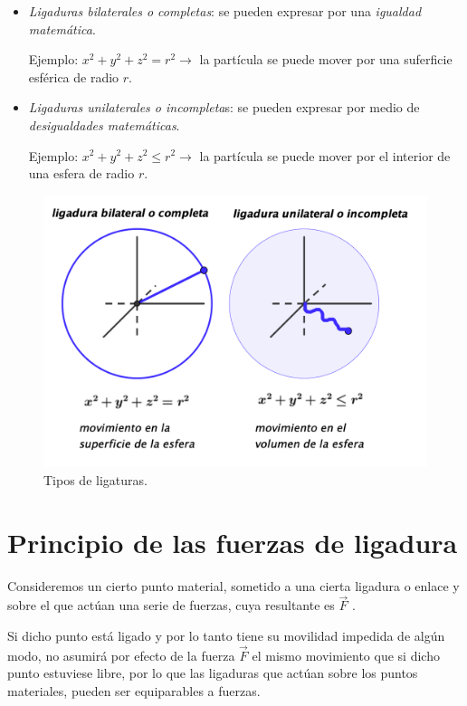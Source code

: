 \vspace{-2mm} %
\begin{itemize}

\item \emph{Ligaduras bilaterales o completas}:	 se pueden expresar por una \emph{igualdad matemática}.

Ejemplo: $x^2+y^2+z^2=r^2 \to $ la partícula se puede mover por una suferficie esférica de radio $r$.

\item \emph{Ligaduras unilaterales o incompleta}s: se pueden expresar por medio de \emph{desigualdades matemáticas}.

Ejemplo: $x^2+y^2+z^2 \le r^2 \to $ la partícula se puede mover por el interior de una esfera de radio $r$.

\end{itemize}

\vspace{-4mm} %
\begin{figure}[H]
	\centering
	\includegraphics[width=.7\textwidth]{imagenes/imagenes05/T05IM01.png}
	\caption*{Tipos de ligaturas.}
\end{figure}

\section{Principio de las fuerzas de ligadura}

Consideremos un cierto punto material, sometido a una cierta ligadura o enlace y sobre el que actúan una serie de fuerzas, cuya resultante es $\overrightarrow{F}$ . 

Si dicho punto está  ligado y por lo tanto tiene su movilidad impedida de algún  modo, no asumirá por efecto de la fuerza  $\overrightarrow{F}$ el mismo movimiento que si dicho punto estuviese libre, por lo que las ligaduras que actúan sobre los puntos materiales, pueden ser equiparables a fuerzas.
 
